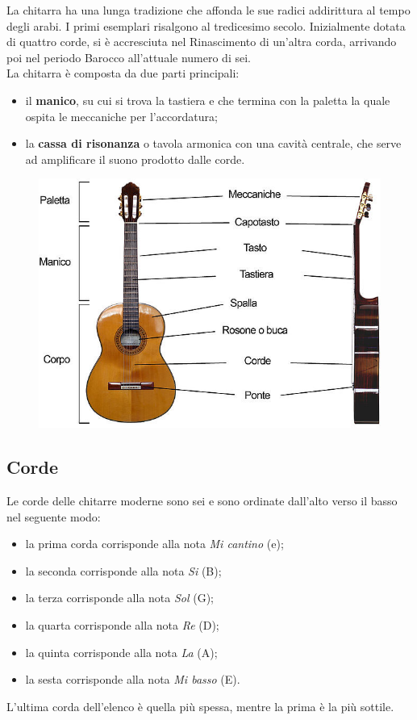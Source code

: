La chitarra ha una lunga tradizione che affonda le sue radici addirittura al tempo degli arabi. I primi esemplari risalgono al tredicesimo secolo. Inizialmente dotata di quattro corde, si è accresciuta nel Rinascimento di un'altra corda, arrivando poi nel periodo Barocco all'attuale numero di sei.\\
\newline
La chitarra è composta da due parti principali:
\begin{itemize}
	\item il \textbf{manico}, su cui si trova la tastiera e che termina con la paletta la quale ospita le meccaniche per l'accordatura;
	\item la \textbf{cassa di risonanza} o tavola armonica con una cavità centrale, che serve ad amplificare il suono prodotto dalle corde.
\end{itemize}

\begin{figure}[H]
	\centering
	\includegraphics[scale=0.50]{./images/img14.jpg}
\end{figure}

\subsection{Corde}
Le corde delle chitarre moderne sono sei e sono ordinate dall'alto verso il basso nel seguente modo:
\begin{itemize}
	\item la prima corda corrisponde alla nota \textit{Mi cantino} (e);
	\item la seconda corrisponde alla nota \textit{Si} (B);
	\item la terza corrisponde alla nota \textit{Sol} (G);
	\item la quarta corrisponde alla nota \textit{Re} (D);
	\item la quinta corrisponde alla nota \textit{La} (A);
	\item la sesta corrisponde alla nota \textit{Mi basso} (E).
\end{itemize}
L'ultima corda dell'elenco è quella più spessa, mentre la prima è la più sottile.

